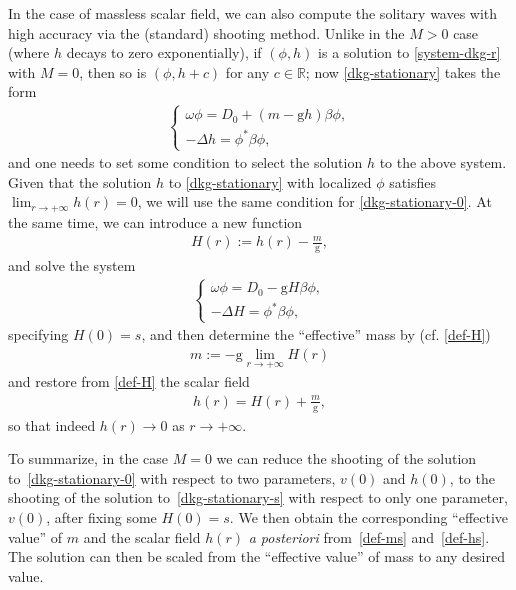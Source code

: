 \documentclass[12pt]{extarticle}
\newcommand{\coupling}{\mathrm{g}}
\def\R{\mathbb{R}}
\theoremstyle{plain}
\theoremstyle{remark}
\begin{document}
In the case of massless scalar field,
we can also compute the solitary waves
with high accuracy
via the (standard) shooting method.
Unlike in the $M>0$ case
(where $h$ decays to zero exponentially),
if
$(\phi,h)$
is a solution to \eqref{system-dkg-r} with $M=0$,
then so is
$(\phi,h+c)$ for any $c\in\R$;
now \eqref{dkg-stationary} takes the form
\begin{align}\label{dkg-stationary-0}
\begin{cases}
\omega\phi=D_0+(m-\coupling h)\beta\phi,
\\
-\Delta h=\phi^*\beta\phi,
\end{cases}
\end{align}
and one needs to set some condition
to select the solution $h$
to the above system.
Given that the solution $h$
to \eqref{dkg-stationary} with localized
$\phi$ satisfies $\lim_{r\to+\infty}h(r)=0$,
we will use the same condition
for \eqref{dkg-stationary-0}.
At the same time, we can introduce a new
function
\begin{align}\label{def-H}
H(r) := h(r) - \frac{m}{\coupling},
\end{align}
and solve the system
\begin{align}\label{dkg-stationary-s}
\begin{cases}
\omega\phi=D_0-\coupling H\beta\phi,
\\
-\Delta H=\phi^*\beta\phi,
\end{cases}
\end{align}
specifying $H(0)=s$,
and then determine the ``effective'' mass
by
(cf. \eqref{def-H})
\begin{align}\label{def-ms}
m:=-\coupling\lim_{r\to+\infty}H(r)
\end{align}
and restore from \eqref{def-H}
the scalar field
\begin{align}\label{def-hs}
h(r)=H(r)+\frac{m}{\coupling},
\end{align}
so that indeed
$h(r)\to 0$ as $r\to+\infty$.

To summarize, in the case
$M=0$ we can reduce
the shooting of the solution to~\eqref{dkg-stationary-0} with respect to two parameters,
$v(0)$ and $h(0)$, to the shooting of the solution to~\eqref{dkg-stationary-s} with respect to only one parameter,
$v(0)$,
after fixing some $H(0)=s$.
We then
obtain the corresponding
``effective value'' of $m$
and the scalar field $h(r)$
\emph{a posteriori}
from~\eqref{def-ms}
and~\eqref{def-hs}.
The solution can then be scaled
from the ``effective value'' of mass
to any desired value.
\end{document}

